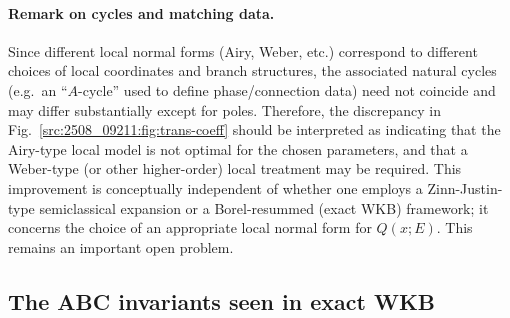 \paragraph{Remark on cycles and matching data.}
Since different local normal forms (Airy, Weber, etc.) correspond to different choices of local coordinates and
branch structures, the associated natural cycles (e.g.\ an ``$A$-cycle'' used to define phase/connection data)
need not coincide and may differ substantially except for poles.
Therefore, the discrepancy in Fig.~\ref{src:2508_09211:fig:trans-coeff} should be interpreted as indicating that the Airy-type local model is not
optimal for the chosen parameters, and that a Weber-type (or other higher-order) local treatment may be required.
This improvement is conceptually independent of whether one employs a Zinn-Justin-type semiclassical expansion
or a Borel-resummed (exact WKB) framework; it concerns the choice of an appropriate local normal form for $Q(x;E)$. This remains an important open problem.
\subsection{The ABC invariants seen in exact WKB}

